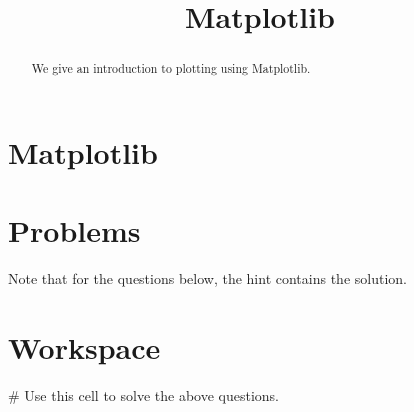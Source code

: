 \documentclass{ximera}
\title{Matplotlib}
\begin{document}
  
\begin{abstract}  
We give an introduction to plotting using Matplotlib.
\end{abstract}  
\maketitle

\section{Matplotlib}





\section{Problems}

Note that for the questions below, the hint contains the solution.

\begin{question}
\end{question}

\section{Workspace}

\begin{sageCell}
# Use this cell to solve the above questions.
\end{sageCell}
\end{document}
